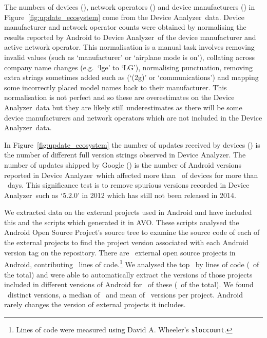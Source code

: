 \documentclass{sig-alternate}
\newcommand{\da}{Device Analyzer}
\newcommand{\avo}{AVO}
\begin{document}
The numbers of devices (\daNumOSDevices), network operators (\daNumOperators) and device manufacturers (\daNumManufacturers) in Figure~\ref{fig:update_ecosystem} come from the \da\ data.
Device manufacturer and network operator counts were obtained by normalising the results reported by Android to \da\ of the device manufacturer and active network operator.
This normalisation is a manual task involves removing invalid values (such as `manufacturer' or `airplane mode is on'), collating across company name changes (e.g.\ `lge' to `LG'), normalising punctuation, removing extra strings sometimes added such as (`(2g)' or `communications') and mapping some incorrectly placed model names back to their manufacturer.
This normalisation is not perfect and so these are overestimates on the \da\ data but they are likely still underestimates as there will be some device manufacturers and network operators which are not included in the \da\ data.

In Figure~\ref{fig:update_ecosystem} the number of updates received by devices (\daNumFullVersions) is the number of different full version strings observed in \da.
The number of updates shipped by Google (\daNumSigOSVersions) is the number of Android versions reported in \da\ which affected more than \daSigVersionPerc\ of devices for more than \daSigVersionDays\ days.
This significance test is to remove spurious versions recorded in \da\ such as `5.2.0' in 2012 which has still not been released in 2014.

We extracted data on the external projects used in Android and have included this and the scripts which generated it in \avo.
These scripts analysed the Android Open Source Project's source tree to examine the source code of each of the external projects to find the project version associated with each Android version tag on the repository.
There are \avoNumExternalProjects\ external open source projects in Android, contributing \avoTotalExternalLines\ lines of code.\footnote{Lines of code were measured using David A. Wheeler's \texttt{sloccount}.}
We analysed the top \avoNumBigExternalProjects\ by lines of code (\avoBigExternalLinesOfCodePerc\ of the total) and were able to automatically extract the versions of those projects included in different versions of Android for \avoNumAnalysedExternalProjects\ of these (\avoAnalysedExternalLinesOfCodePerc\ of the total).
We found \avoBigExternalTotalVersions\ distinct versions, a median of \avoBigExternalMedianVersions\ and mean of \avoBigExternalMeanVersions\ versions per project.
Android rarely changes the version of external projects it includes.
\end{document}
